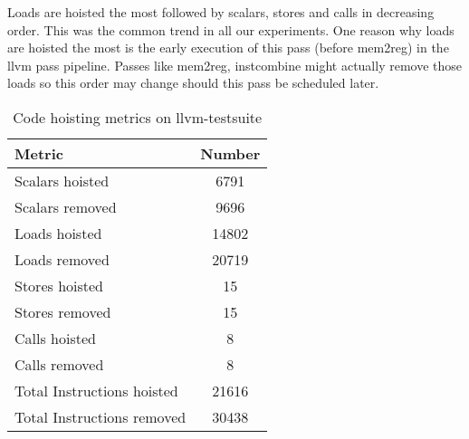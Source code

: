 \documentclass{sig-alternate}
\begin{document}
Loads are hoisted the most followed by scalars, stores and calls in decreasing
order.  This was the common trend in all our experiments. One reason why loads
are hoisted the most is the early execution of this pass (before mem2reg) in the
llvm pass pipeline. Passes like mem2reg, instcombine might actually remove
those loads so this order may change should this pass be scheduled later.

\begin{table}[h!]
  \begin{center}
    \begin{tabular}{|l|c|}
      \hline
      Metric               & Number\\\hline
      Scalars hoisted      & 6791  \\\hline
      Scalars removed      & 9696  \\\hline
      Loads hoisted        & 14802 \\\hline
      Loads removed        & 20719 \\\hline
      Stores hoisted       & 15    \\\hline
      Stores removed       & 15    \\\hline
      Calls hoisted        & 8     \\\hline
      Calls removed        & 8     \\\hline
      Total Instructions hoisted & 21616 \\\hline
      Total Instructions removed & 30438 \\\hline
\end{tabular}
  \end{center}
  \caption{Code hoisting metrics on llvm-testsuite}
  \label{tab:hoist-results}
\end{table}
\end{document}
